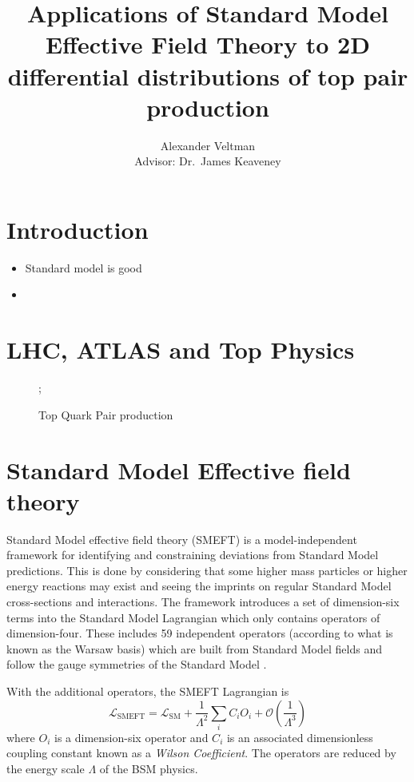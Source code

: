 \documentclass[a4paper]{article}
\title{Applications of Standard Model Effective Field Theory to 2D differential distributions of top pair production}
\author{Alexander Veltman\\{\small Advisor: Dr.\ James Keaveney}}
\affil{Department of Physics,\\University of Cape Town}
\begin{document}
\maketitle

\begin{abstract}
\end{abstract}

\section{Introduction}

\begin{itemize}
    \item Standard model is good
    \item
\end{itemize}

\section{LHC, ATLAS and Top Physics}

\begin{figure}[h]
    \centering
    ;
    \caption{Top Quark Pair production}
\end{figure}


\section{Standard Model Effective field theory}

Standard Model effective field theory (SMEFT) is a model-independent framework for identifying and constraining deviations from Standard Model predictions.
This is done by considering that some higher mass particles or higher energy reactions may exist and seeing the imprints on regular Standard Model cross-sections and interactions.
The framework introduces a set of dimension-six terms into the Standard Model Lagrangian which only contains operators of dimension-four.
These includes 59 independent operators (according to what is known as the Warsaw basis) which are built from Standard Model fields and follow the gauge symmetries of the Standard Model \cite{Grzadkowski_2010}.


With the additional operators, the SMEFT Lagrangian is
\begin{equation}\label{eq:smeft_lagrangian}
    \mathcal{L}_{\text{SMEFT}} = \mathcal{L}_{\text{SM}} + \frac{1}{\Lambda^2} \sum\limits_{i} C_{i} O_{i} + \mathcal{O}\left(\frac{1}{\Lambda^3}\right)
\end{equation}
where $O_{i}$ is a dimension-six operator and $C_{i}$ is an associated dimensionless coupling constant known as a \emph{Wilson Coefficient}.
The operators are reduced by the energy scale $\Lambda$ of the BSM physics.
\end{document}
